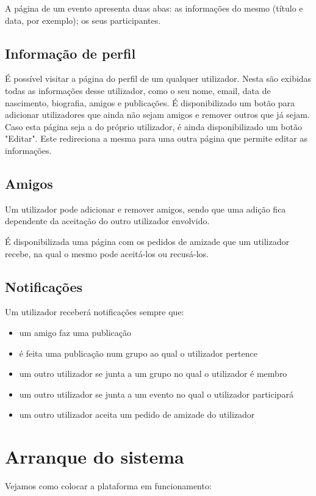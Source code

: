 \documentclass[a4paper]{report}
\begin{document}
    A página de um evento apresenta duas abas: as informações do mesmo (título e data, por exemplo); os seus participantes.


    \subsection{Informação de perfil}
    É possível visitar a página do perfil de um qualquer utilizador. Nesta são exibidas todas as informações desse utilizador, como o seu nome, email, data de nascimento, biografia, amigos e publicações.
    É disponibilizado um botão para adicionar utilizadores que ainda não sejam amigos e remover outros que já sejam.
    Caso esta página seja a do próprio utilizador, é ainda disponibilizado um botão "Editar". Este redireciona a mesma para uma outra página que permite editar as informações.


    \subsection{Amigos}
    Um utilizador pode adicionar e remover amigos, sendo que uma adição fica dependente da aceitação do outro utilizador envolvido.

    É disponibilizada uma página com os pedidos de amizade que um utilizador recebe, na qual o mesmo pode aceitá-los ou recusá-los.


    \subsection{Notificações}
    Um utilizador receberá notificações sempre que:
    \begin{itemize}
        \item um amigo faz uma publicação
        \item é feita uma publicação num grupo ao qual o utilizador pertence
        \item um outro utilizador se junta a um grupo no qual o utilizador é membro
        \item um outro utilizador se junta a um evento no qual o utilizador participará
        \item um outro utilizador aceita um pedido de amizade do utilizador 
    \end{itemize}


	\section{Arranque do sistema} %
	Vejamos como colocar a plataforma em funcionamento:
\end{document}
